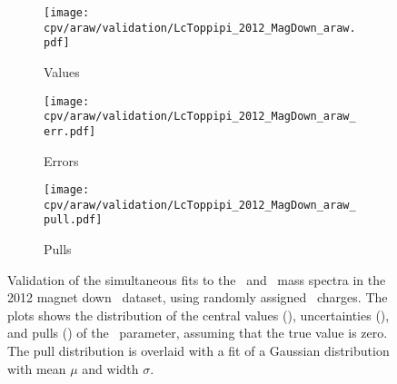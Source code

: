 \begin{figure}
  \begin{subfigure}[t]{0.32\textwidth}
    \texttt{[image: cpv/araw/validation/LcToppipi\_2012\_MagDown\_araw.pdf]}
    \caption{Values}
    \label{fig:cpv:araw:validation:null:ppipi:values}
  \end{subfigure}
  \begin{subfigure}[t]{0.32\textwidth}
    \texttt{[image: cpv/araw/validation/LcToppipi\_2012\_MagDown\_araw\_err.pdf]}
    \caption{Errors}
    \label{fig:cpv:araw:validation:null:ppipi:errors}
  \end{subfigure}
  \begin{subfigure}[t]{0.32\textwidth}
    \texttt{[image: cpv/araw/validation/LcToppipi\_2012\_MagDown\_araw\_pull.pdf]}
    \caption{Pulls}
    \label{fig:cpv:araw:validation:null:ppipi:pulls}
  \end{subfigure}
  \caption{%
    Validation of the simultaneous fits to the \PLambdac\ and \APLambdac\ mass 
    spectra in the 2012 magnet down \ppipi\ dataset, using randomly assigned 
    \PLambdac\ charges.
    The plots shows the distribution of the central values 
    (), uncertainties 
    (), and pulls 
    () of the \ARaw\ parameter, 
    assuming that the true value is zero.
    The pull distribution is overlaid with a fit of a Gaussian distribution 
    with mean $\mu$ and width $\sigma$.
  }
  \label{fig:cpv:araw:validation:null:ppipi}
\end{figure}
